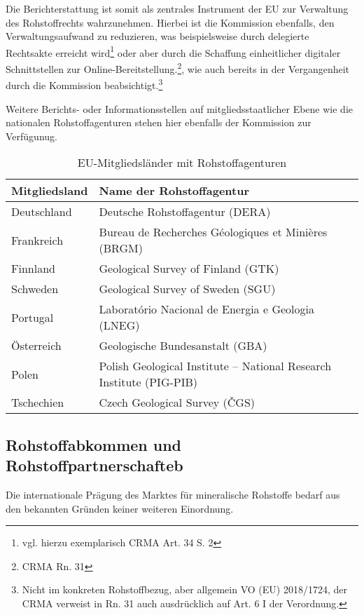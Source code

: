 \documentclass[12pt,a4paper,oneside]{book} %
\begin{document}
	Die Berichterstattung ist somit als zentrales Instrument der EU zur Verwaltung des Rohstoffrechts wahrzunehmen. Hierbei ist die Kommission ebenfalls, den Verwaltungsaufwand zu reduzieren, was beispielsweise durch delegierte Rechtsakte erreicht wird\footnote{vgl. hierzu exemplarisch CRMA Art. 34 S. 2} oder aber durch die Schaffung einheitlicher digitaler Schnittstellen zur Online-Bereitstellung.\footnote{CRMA Rn. 31}, wie auch bereits in der Vergangenheit durch die Kommission beabsichtigt.\footnote{Nicht im konkreten Rohstoffbezug, aber allgemein VO (EU) 2018/1724, der CRMA verweist in Rn. 31 auch ausdrücklich auf Art. 6 I der Verordnung.}
	
	Weitere Berichts- oder Informationsstellen auf mitgliedsstaatlicher Ebene wie die nationalen Rohstoffagenturen stehen hier ebenfalls der Kommission zur Verfügunug.
	\begin{table}[h!]
		\centering
		\begin{tabular}{|l|l|}
			\hline
			\textbf{Mitgliedsland} & \textbf{Name der Rohstoffagentur} \\ \hline
			Deutschland            & Deutsche Rohstoffagentur (DERA) \\ \hline
			Frankreich             & Bureau de Recherches Géologiques et Minières (BRGM) \\ \hline
			Finnland               & Geological Survey of Finland (GTK) \\ \hline
			Schweden               & Geological Survey of Sweden (SGU) \\ \hline
			Portugal               & Laboratório Nacional de Energia e Geologia (LNEG) \\ \hline
			Österreich             & Geologische Bundesanstalt (GBA) \\ \hline
			Polen                  & Polish Geological Institute – National Research Institute (PIG-PIB) \\ \hline
			Tschechien             & Czech Geological Survey (ČGS) \\ \hline
		\end{tabular}
		\caption{EU-Mitgliedsländer mit Rohstoffagenturen}
		\label{tab:rohstoffagenturen}
	\end{table}
	
	
	

	
	
	
\subsection{Rohstoffabkommen und Rohstoffpartnerschafteb}
Die internationale Prägung des Marktes für mineralische Rohstoffe bedarf aus den bekannten Gründen keiner weiteren Einordnung.
\end{document}
